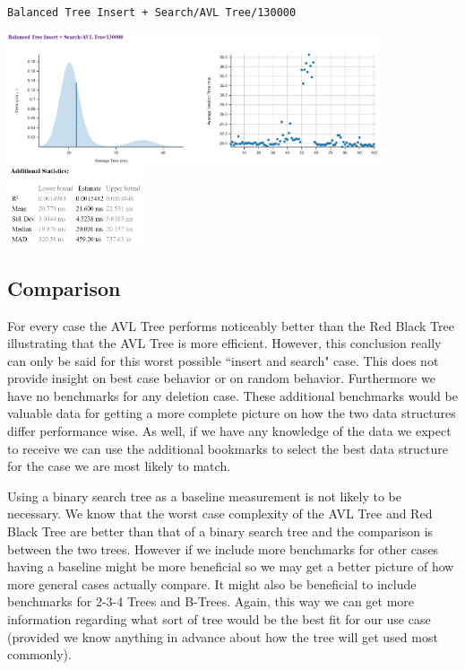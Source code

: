 \documentclass[11pt, letterpaper]{article}
\begin{document}
\texttt{Balanced Tree Insert + Search/AVL Tree/130000}
\begin{paracol}{3}
    \centering        
    \includegraphics[width=11cm]{benchmarks/AVL/130000/plots.png}
    \switchcolumn
    \vspace*{\fill}
    \includegraphics[width=4cm]{benchmarks/AVL/130000/stats.png}
    \vspace*{\fill}
\end{paracol}

\subsection{Comparison}
For every case the AVL Tree performs noticeably better than the Red Black Tree illustrating that the AVL Tree is more efficient.
However, this conclusion really can only be said for this worst possible ``insert and search" case.  This does not provide insight on best case behavior or on random behavior.
Furthermore we have no benchmarks for any deletion case.  These additional benchmarks would be valuable data for getting a more complete picture on how
the two data structures differ performance wise.  As well, if we have any knowledge of the data we expect to receive we can use the additional bookmarks to select the best data structure for the
case we are most likely to match.

Using a binary search tree as a baseline measurement is not likely to be necessary.  We know that the worst case complexity of the AVL Tree and Red Black Tree are better than
that of a binary search tree and the comparison is between the two trees.  However if we include more benchmarks for other cases having a baseline might be more beneficial
so we may get a better picture of how more general cases actually compare.  It might also be beneficial to include benchmarks for 2-3-4 Trees and B-Trees.  Again, this way we can get
more information regarding what sort of tree would be the best fit for our use case (provided we know anything in advance about how the tree will get used most commonly).
\end{document}
